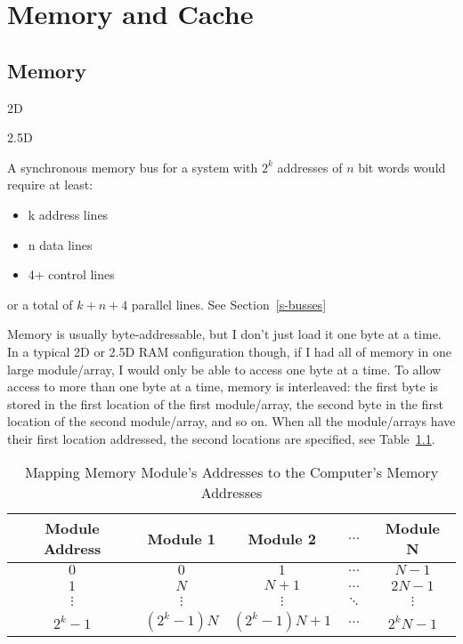 \chapter{Memory and Cache}
\label{c-cache}


\section{Memory}

2D

2.5D

A synchronous memory bus for a system with $2^k$ addresses of $n$ bit words would require at least:
\begin{itemize}
    \item k address lines
    \item n data lines
    \item 4+ control lines
\end{itemize}
or a total of $k+n+4$ parallel lines.  See Section~\ref{s-busses}

Memory is usually byte-addressable, but I don't just load it one byte at a time.  In a typical 2D or 2.5D RAM configuration though, if I had all of memory in one large module/array, I would only be able to access one byte at a time.  To allow access to more than one byte at a time, memory is interleaved: the first byte is stored in the first location of the first module/array, the second byte in the first location of the second module/array, and so on.  When all the module/arrays have their first location addressed, the second locations are specified, see Table~\ref{t-memadd}.

\begin{table}[h]
  \centering
  \begin{tabular}{|c|c|c|c|c|}
    \hline
    Module Address  & Module 1   & Module 2     & $\ldots$ & Module N \\ \hline
    $0$      & $0$        & $1$          & $\ldots$ & $N-1$    \\
    $1$      & $N$        & $N+1$        & $\ldots$ & $2N-1$   \\
    $\vdots$ & $\vdots$   & $\vdots$     & $\ddots$ & $\vdots$ \\
    $2^k-1$  & $(2^k-1)N$ & $(2^k-1)N+1$ & $\ldots$ & $2^kN-1$ \\ \hline
  \end{tabular}
  \caption{Mapping Memory Module's Addresses to the Computer's Memory Addresses}\label{t-memadd}
\end{table}

